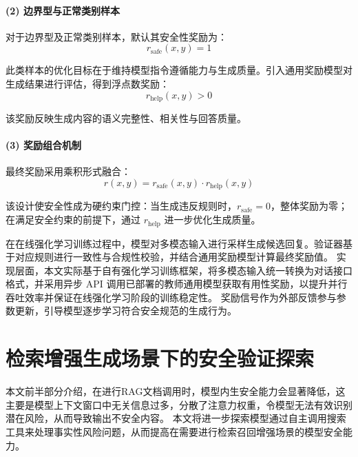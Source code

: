 \paragraph{(2) 边界型与正常类别样本}

对于边界型及正常类别样本，默认其安全性奖励为：
\begin{equation}
r_{\mathrm{safe}}(x,y) = 1
\end{equation}

此类样本的优化目标在于维持模型指令遵循能力与生成质量。引入通用奖励模型对生成结果进行评估，得到浮点数奖励：
\begin{equation}
r_{\mathrm{help}}(x,y) > 0
\end{equation}

该奖励反映生成内容的语义完整性、相关性与回答质量。

\paragraph{(3) 奖励组合机制}

最终奖励采用乘积形式融合：
\begin{equation}
r(x,y) = r_{\mathrm{safe}}(x,y) \cdot r_{\mathrm{help}}(x,y)
\end{equation}

该设计使安全性成为硬约束门控：当生成违反规则时，$r_{\mathrm{safe}}=0$，整体奖励为零；在满足安全约束的前提下，通过 $r_{\mathrm{help}}$ 进一步优化生成质量。

在在线强化学习训练过程中，模型对多模态输入进行采样生成候选回复。验证器基于对应规则进行一致性与合规性校验，并结合通用奖励模型计算最终奖励值。
实现层面，本文实际基于自有强化学习训练框架，将多模态输入统一转换为对话接口格式，并采用异步 API 调用已部署的教师通用模型获取有用性奖励，以提升并行吞吐效率并保证在线强化学习阶段的训练稳定性。
奖励信号作为外部反馈参与参数更新，引导模型逐步学习符合安全规范的生成行为。

\section{检索增强生成场景下的安全验证探索}
本文前半部分介绍，在进行RAG文档调用时，模型内生安全能力会显著降低，这主要是模型上下文窗口中无关信息过多，分散了注意力权重，令模型无法有效识别潜在风险，从而导致输出不安全内容。
本文将进一步探索模型通过自主调用搜索工具来处理事实性风险问题，从而提高在需要进行检索召回增强场景的模型安全能力。

